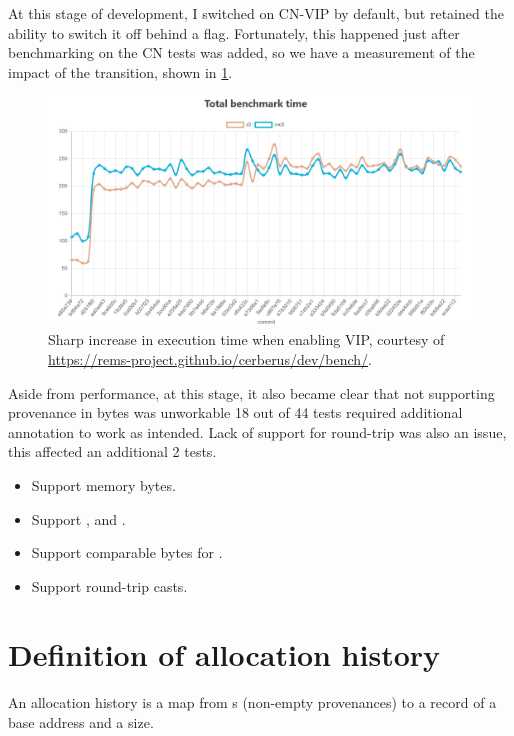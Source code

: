 At this stage of development, I switched on CN-VIP by default, but retained the
ability to switch it off behind a flag. Fortunately, this happened just after
benchmarking on the CN tests was added, so we have a measurement of the impact
of the transition, shown in \cref{fig:vip-performance-hit}.

\begin{figure}[h]
    \centering
    \includegraphics[width=\textwidth]{../misc/vip-performance-hit.png}
    \caption{Sharp increase in execution time when enabling VIP, courtesy of
        \url{https://rems-project.github.io/cerberus/dev/bench/}.}\label{fig:vip-performance-hit}
\end{figure}

Aside from performance, at this stage, it also became clear that not supporting
provenance in bytes was unworkable \textemdash{} 18 out of 44 tests required
additional  annotation to work as intended. Lack of
support for round-trip was also an issue, this affected an additional 2 tests.

\begin{itemize}
    \item Support memory bytes.
    \item Support ,  and .
    \item Support comparable bytes for .
    \item Support round-trip casts.
\end{itemize}

\section{Definition of allocation history}

An allocation history is a map from s (non-empty provenances) to a
record of a base address and a size.

